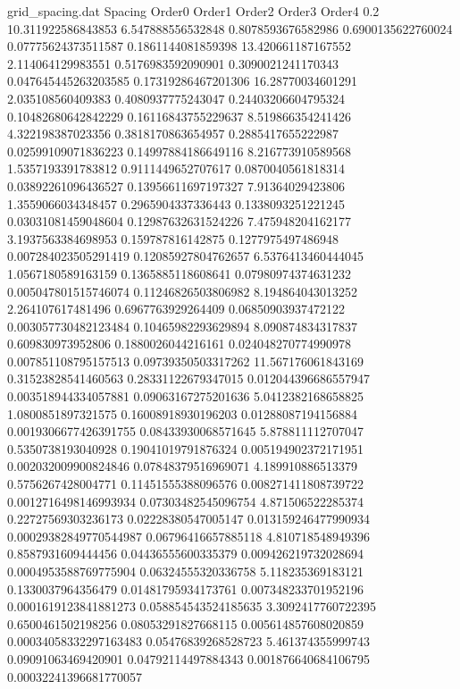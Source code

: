 \begin{filecontents}{grid_spacing.dat}
Spacing             	Order0            	Order1              	Order2                	Order3                	Order4                 
0.2                 	10.311922586843853	6.547888556532848   	0.8078593676582986    	0.6900135622760024    	0.07775624373511587    
0.1861144081859398  	13.420661187167552	2.114064129983551   	0.5176983592090901    	0.3090021241170343    	0.047645445263203585   
0.17319286467201306 	16.28770034601291 	2.035108560409383   	0.4080937775243047    	0.24403206604795324   	0.10482680642842229    
0.16116843755229637 	8.519866354241426 	4.322198387023356   	0.3818170863654957    	0.2885417655222987    	0.02599109071836223    
0.14997884186649116 	8.216773910589568 	1.5357193391783812  	0.9111449652707617    	0.0870040561818314    	0.03892261096436527    
0.13956611697197327 	7.91364029423806  	1.3559066034348457  	0.2965904337336443    	0.1338093251221245    	0.03031081459048604    
0.12987632631524226 	7.475948204162177 	3.1937563384698953  	0.159787816142875     	0.1277975497486948    	0.007284023505291419   
0.12085927804762657 	6.5376413460444045	1.0567180589163159  	0.1365885118608641    	0.07980974374631232   	0.005047801515746074   
0.11246826503806982 	8.194864043013252 	2.264107617481496   	0.6967763929264409    	0.06850903937472122   	0.003057730482123484   
0.10465982293629894 	8.090874834317837 	0.609830973952806   	0.1880026044216161    	0.024048270774990978  	0.007851108795157513   
0.09739350503317262 	11.567176061843169	0.31523828541460563 	0.28331122679347015   	0.012044396686557947  	0.003518944334057881   
0.09063167275201636 	5.0412382168658825	1.0800851897321575  	0.16008918930196203   	0.01288087194156884   	0.0019306677426391755  
0.08433930068571645 	5.878811112707047 	0.5350738193040928  	0.19041019791876324   	0.005194902372171951  	0.002032009900824846   
0.07848379516969071 	4.189910886513379 	0.5756267428004771  	0.11451555388096576   	0.008271411808739722  	0.0012716498146993934  
0.07303482545096754 	4.871506522285374 	0.22727569303236173 	0.02228380547005147   	0.013159246477990934  	0.00029382849770544987 
0.06796416657885118 	4.810718548949396 	0.8587931609444456  	0.04436555600335379   	0.009426219732028694  	0.0004953588769775904  
0.06324555320336758 	5.118235369183121 	0.1330037964356479  	0.01481795934173761   	0.007348233701952196  	0.0001619123841881273  
0.058854543524185635	3.3092417760722395	0.6500461502198256  	0.08053291827668115   	0.005614857608020859  	0.00034058332297163483 
0.05476839268528723 	5.461374355999743 	0.09091063469420901 	0.04792114497884343   	0.001876640684106795  	0.00032241396681770057 

\end{filecontents}
